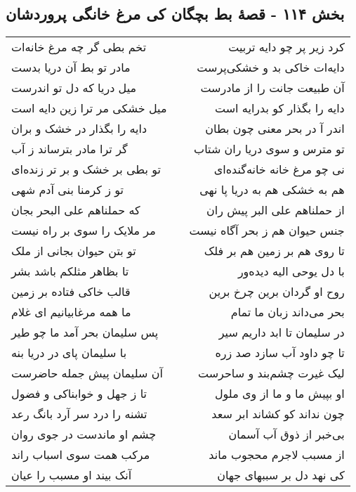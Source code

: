 \begin{center}
\section*{بخش ۱۱۴ - قصهٔ بط بچگان کی مرغ خانگی پروردشان}
\label{sec:sh114}
\begin{longtable}{l p{0.5cm} r}
تخم بطی گر چه مرغ خانه‌ات
&&
کرد زیر پر چو دایه تربیت
\\
مادر تو بط آن دریا بدست
&&
دایه‌ات خاکی بد و خشکی‌پرست
\\
میل دریا که دل تو اندرست
&&
آن طبیعت جانت را از مادرست
\\
میل خشکی مر ترا زین دایه است
&&
دایه را بگذار کو بدرایه است
\\
دایه را بگذار در خشک و بران
&&
اندر آ در بحر معنی چون بطان
\\
گر ترا مادر بترساند ز آب
&&
تو مترس و سوی دریا ران شتاب
\\
تو بطی بر خشک و بر تر زنده‌ای
&&
نی چو مرغ خانه خانه‌گنده‌ای
\\
تو ز کرمنا بنی آدم شهی
&&
هم به خشکی هم به دریا پا نهی
\\
که حملناهم علی البحر بجان
&&
از حملناهم علی البر پیش ران
\\
مر ملایک را سوی بر راه نیست
&&
جنس حیوان هم ز بحر آگاه نیست
\\
تو بتن حیوان بجانی از ملک
&&
تا روی هم بر زمین هم بر فلک
\\
تا بظاهر مثلکم باشد بشر
&&
با دل یوحی الیه دیده‌ور
\\
قالب خاکی فتاده بر زمین
&&
روح او گردان برین چرخ برین
\\
ما همه مرغابیانیم ای غلام
&&
بحر می‌داند زبان ما تمام
\\
پس سلیمان بحر آمد ما چو طیر
&&
در سلیمان تا ابد داریم سیر
\\
با سلیمان پای در دریا بنه
&&
تا چو داود آب سازد صد زره
\\
آن سلیمان پیش جمله حاضرست
&&
لیک غیرت چشم‌بند و ساحرست
\\
تا ز جهل و خوابناکی و فضول
&&
او بپیش ما و ما از وی ملول
\\
تشنه را درد سر آرد بانگ رعد
&&
چون نداند کو کشاند ابر سعد
\\
چشم او ماندست در جوی روان
&&
بی‌خبر از ذوق آب آسمان
\\
مرکب همت سوی اسباب راند
&&
از مسبب لاجرم محجوب ماند
\\
آنک بیند او مسبب را عیان
&&
کی نهد دل بر سببهای جهان
\\
\end{longtable}
\end{center}
